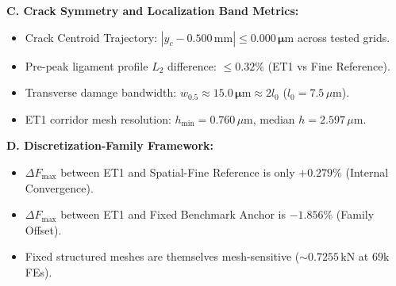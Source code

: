\documentclass[10pt,a4paper]{article}
\begin{document}
\begin{minipage}[t]{0.485\textwidth}
  \textbf{\footnotesize C. Crack Symmetry and Localization Band Metrics:}
  \begin{itemize}[noitemsep,topsep=1pt,leftmargin=4mm]
    \scriptsize
    \item Crack Centroid Trajectory: $|y_c - 0.500\,\mathrm{mm}| \le \mathbf{0.000\,\mu\mathrm{m}}$ across tested grids.
    \item Pre-peak ligament profile $L_2$ difference: $\le \mathbf{0.32\%}$ (ET1 vs Fine Reference).
    \item Transverse damage bandwidth: $w_{0.5} \approx \mathbf{15.0\,\mu\mathrm{m}} \approx 2 l_0$ ($l_0 = 7.5\,\mu\mathrm{m}$).
    \item ET1 corridor mesh resolution: $h_{\min} = 0.760\,\mu\mathrm{m}$, median $h = 2.597\,\mu\mathrm{m}$.
  \end{itemize}
  \vspace{0.3em}
  \textbf{\footnotesize D. Discretization-Family Framework:}
  \begin{itemize}[noitemsep,topsep=1pt,leftmargin=4mm]
    \scriptsize
    \item $\Delta F_{\max}$ between ET1 and Spatial-Fine Reference is only $\mathbf{+0.279\%}$ (Internal Convergence).
    \item $\Delta F_{\max}$ between ET1 and Fixed Benchmark Anchor is $\mathbf{-1.856\%}$ (Family Offset).
    \item Fixed structured meshes are themselves mesh-sensitive ($\sim 0.7255\,\mathrm{kN}$ at $69\mathrm{k}$ FEs).
  \end{itemize}
\end{minipage}
\end{document}

